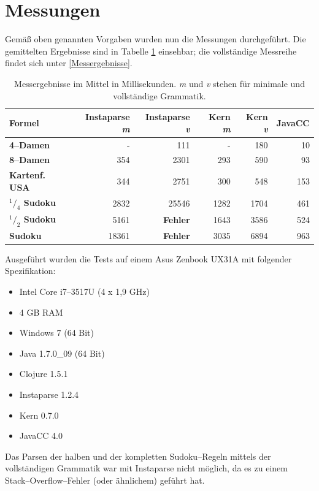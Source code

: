 \documentclass[ngerman,a4paper,abstracton,open=right,twoside=false,toc=listofnumbered,bibtotocnumbered]{scrreprt}
\begin{document}
\section{Messungen}

Gemäß oben genannten Vorgaben wurden nun die Messungen durchgeführt. Die gemittelten Ergebnisse sind in Tabelle \ref{messergebnisse-kurz} einsehbar; die vollständige Messreihe findet sich unter \ref{Messergebnisse}.

\begin{table}[h]
	\begin{tabular}{|l|r|r|r|r|r|}
		\hline
		\textbf{Formel} & \textbf{Instaparse \emph{m}} & \textbf{Instaparse \emph{v}} & \textbf{Kern \emph{m}} & \textbf{Kern \emph{v}} & \textbf{JavaCC} \\ \hline
		\textbf{4--Damen} & - & 111 & - & 180 & 10 \\ \hline
		\textbf{8--Damen} & 354 & 2301 & 293 & 590 & 93 \\ \hline
		\textbf{Kartenf. USA} & 344 & 2751 & 300 & 548 & 153 \\ \hline
		\textbf{$^1/_4$ Sudoku} & 2832 & 25546 & 1282 & 1704 & 461 \\ \hline
		\textbf{$^1/_2$ Sudoku} & 5161 & \textbf{Fehler} & 1643 & 3586 & 524 \\ \hline
		\textbf{Sudoku} & 18361 & \textbf{Fehler} & 3035 & 6894 & 963 \\ \hline 
	\end{tabular}
	\label{messergebnisse-kurz}
	\caption{Messergebnisse im Mittel in Millisekunden. \emph{m} und \emph{v} stehen für \glqq{}minimale\grqq{} und \glqq{}vollständige Grammatik\grqq.}
\end{table}

Ausgeführt wurden die Tests auf einem Asus Zenbook UX31A mit folgender Spezifikation:

\begin{itemize}
	\item Intel Core i7--3517U (4 x 1,9 GHz)
	\item 4 GB RAM
	\item Windows 7 (64 Bit)
	\item Java 1.7.0\_09 (64 Bit)
	\item Clojure 1.5.1
	\item Instaparse 1.2.4
	\item Kern 0.7.0
	\item JavaCC 4.0
\end{itemize}

Das Parsen der halben und der kompletten Sudoku--Regeln mittels der vollständigen Grammatik war mit Instaparse nicht möglich, da es zu einem Stack--Overflow--Fehler (oder ähnlichem) geführt hat.
\end{document}
